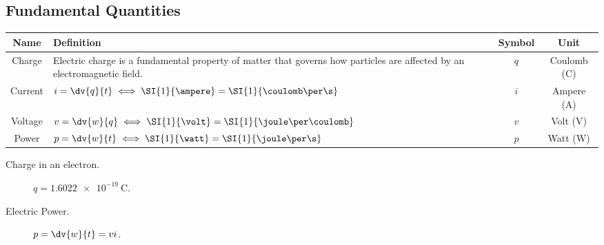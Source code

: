 \documentclass{article}
\begin{document}
\subsection{Fundamental Quantities}
\begingroup
\renewcommand{\arraystretch}{1.5}
\begin{table}[H]
    \centering
    \begin{tabular}{c | >{\centering}p{} | c c}
        \toprule
        \textbf{Name} & \textbf{Definition}                                                                                                      & \textbf{Symbol}           & \textbf{Unit} \\
        \midrule
        Charge        & Electric charge is a fundamental property of matter that governs how particles are affected by an electromagnetic field.
                      & $q$                                                                                                                      & Coulomb (\unit{\coulomb})                 \\
        \hline
        Current       & $i=\dv{q}{t}\iff\SI{1}{\ampere}=\SI{1}{\coulomb\per\s}$
                      & $i$                                                                                                                      & Ampere (\unit{\ampere})                   \\
        \hline
        Voltage       & $v=\dv{w}{q}\iff\SI{1}{\volt}=\SI{1}{\joule\per\coulomb}$
                      & $v$                                                                                                                      & Volt (\unit{\volt})                       \\
        \hline
        Power         & $p=\dv{w}{t}\iff\SI{1}{\watt}=\SI{1}{\joule\per\s}$
                      & $p$                                                                                                                      & Watt (\unit{\watt})                       \\
        \bottomrule
    \end{tabular}
\end{table}
\endgroup
\begin{description}
    \item[Charge in an electron.] $q=\SI{1.6022e-19}{\coulomb}$.
    \item[Electric Power.] $p=\dv{w}{t}=vi$.
\end{description}
\end{document}
